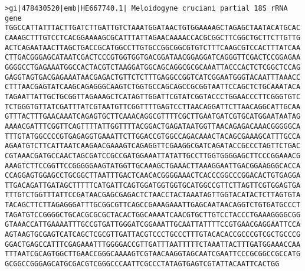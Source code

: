 \documentclass[11pt]{article}
\begin{document}
\begin{Verbatim}[commandchars=\\\{\}]
>gi|478430520|emb|HE667740.1| Meloidogyne cruciani partial 18S rRNA gene
TGGCCATTATTTACTTGATCTTGATTGTCTAAATGGATAACTGTGGAAAAGCTAGAGCTAATACATGCAC
CAAAGCTTTGTCCTCACGGAAAAGCGCATTTATTAGAACAAAACCACGCGGCTTCGGCTGCTTCTTGTTG
ACTCAGAATAACTTAGCTGACCGCATGGCCTTGTGCCGGCGGCGTGTCTTTCAAGCGTCCACTTTATCAA
CTTGACGGGAGCATAATCGACTCCCGTGGTGGTGACGGATAACGGAGGATCAGGGTTCGACTCCGGAGAA
GGGGCCTGAGAAATGGCCACTACGTCTAAGGATGGCAGCAGGCGCGCAAATTACCCACTCTCGGCTCCAG
GAGGTAGTGACGAGAAATAACGAGACTGTTCTCTTTGAGGCCGGTCATCGGAATGGGTACAATTTAAACC
CTTTAACGAGTATCAAGCAGAGGGCAAGTCTGGTGCCAGCAGCCGCGGTAATTCCAGCTCTGCAAATACA
TAGAATTATTGCTGCGGTTAGAAAGCTCATAGTTGGATTCGTATCGGTACCCTGGAACCCTTCGGGTGTC
TCTGGGTGTTATCGATTTATCGTAATGTTCGGTTTTGAGTCCTTAACAGGATTCTTAACAGGCATTGCAA
GTTTACTTTGAACAAATCAGAGTGCTTCAAACAGGCGTTTTCGCTTGAATGATCGTGCATGGAATAATAG
AAAACGATTTCGGTTCAGTTTTATTGGTTTTACGGACTGAGATAATGGTTAACAGAGACAAACGGGGGCA
TTTGTATGGCCCCGTGAGAGGTGAAATTCTTGGACCGTGGCCAGACAAACTACAGCGAAAGCATTTGCCA
AGAATGTCTTCATTAATCAAGAACGAAAGTCAGAGGTTCGAAGGCGATCAGATACCGCCCTAGTTCTGAC
CGTAAACGATGCCAACTAGCGATCCGCCGATGGAAATTATATTGCCTTGGTGGGGAGCTTCCCGGAAACG
AAAGTCTTCCGGTTCCGGGGGAAGTATGGTTGCAAAGCTGAAACTTAAAGGAATTGACGGAAGGGCACCA
CCAGGAGTGGAGCCTGCGGCTTAATTTGACTCAACACGGGGAAACTCACCCGGCCCGGACACTGTGAGGA
TTGACAGATTGATAGCTTTTTCATGATTCAGTGGATGGTGGTGCATGGCCGTTCTTAGTTCGTGGAGTGA
TTTGTCTGGTTTATTCCGATAACGAGCGAGACTCTAACCTACTAAATAGTTGGTACATACTCTTAGTGTA
TACAGCTTCTTAGAGGGATTTGCGGCGTTCAGCCGAAAGAAATTGAGCAATAACAGGTCTGTGATGCCCT
TAGATGTCCGGGGCTGCACGCGCGCTACACTGGCAAAATCAACGTGCTTGTCCTACCCTGAAAGGGGCGG
GTAAACCATTGAAAATTTGCCGTGATTGGGATCGGAAATTGCAATTATTTTCCGTGAACGAGGAATTCCA
AGTAAGTGCGAGTCATCAGCTCGCGTTGATTACGTCCCTGCCCTTTGTACACACCGCCCGTCGCTGCCCG
GGACTGAGCCATTTCGAGAAATTTGGGGACCGTTGATTTAATTTTTCTAAATTACTTTGATGGAAACCAA
TTTAATCGCAGTGGCTTGAACCGGGCAAAAGTCGTAACAAGGTAGCAATCGAATTCCCGCGGCCGCCATG
GCGGCCGGGAGCATGCGACGTCGGGCCCAATTCGCCCTATAGTGAGTCGTATTACAATTCACTGG


\end{Verbatim}
\end{document}

